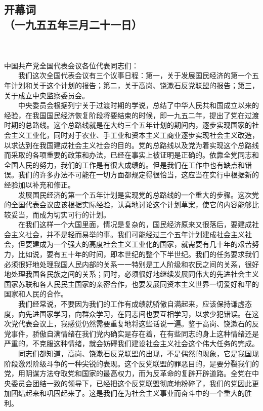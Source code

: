 \documentclass[cn,11pt,chinese]{elegantbook}
\def\myformat#1{\hfil\hfil #1}
\begin{document}
\subsection*{\myformat{开幕词}\\\myformat{（一九五五年三月二十一日）}}
\\~~\\
中国共产党全国代表会议各位代表同志们：\\
　　我们这次全国代表会议有三个议事日程：第一，关于发展国民经济的第一个五年计划和关于这个计划的报告；第二，关于高岗、饶漱石反党联盟的报告；第三，关于成立中央监察委员会。\\
　　中央委员会根据列宁关于过渡时期的学说，总结了中华人民共和国成立以来的经验，在我国国民经济恢复阶段将要结束的时候，即一九五二年，提出了党在过渡时期的总路线。这个总路线就是在大约三个五年计划的期间内，逐步实现国家的社会主义工业化，同时对于农业、手工业和资本主义工商业逐步实现社会主义改造，以求达到在我国建成社会主义社会的目的。党的总路线以及党为着实现这个总路线而采取的各项重要的政策和办法，已经在事实上被证明是正确的。依靠全党同志和全国人民的努力，我们的工作是有很大成绩的。但是我们在工作中也有缺点和错误。我们的许多办法不可能在一切方面都规定得很恰当，这应当在实行中根据新的经验加以补充和修正。\\
　　发展国民经济的第一个五年计划是实现党的总路线的一个重大的步骤。这次党的全国代表会议应该根据实际经验，认真地讨论这个计划草案，使它的内容能够比较妥当，而成为切实可行的计划。\\
　　在我们这样一个大国里面，情况是复杂的，国民经济原来又很落后，要建成社会主义社会，并不是轻而易举的事。我们可能经过三个五年计划建成社会主义社会，但要建成为一个强大的高度社会主义工业化的国家，就需要有几十年的艰苦努力，比如说，要有五十年的时间，即本世纪的整个下半世纪。我们的任务要求我们必须很好地处理我国人民内部的关系一一特别是工人阶级和农民之间的关系，很好地处理我国各民族之间的关系；同时，必须很好地继续发展同伟大的先进社会主义国家苏联和各人民民主国家的亲密合作，也要发展同资本主义世界一切爱好和平的国家和人民的合作。\\
　　我们经常说，不要因为我们的工作有成绩就骄傲自满起来，应该保持谦虚态度，向先进国家学习，向群众学习，在同志间也要互相学习，以求少犯错误。在这次党代表会议上，我感觉仍然需要重复地将这些话说一遍。鉴于高岗、饶漱石的反党事件，骄傲自满情绪在我们党内确实是存在着，在有些同志的身上这种情绪还是严重的，不克服这种情绪，就会妨碍我们建设社会主义社会这个伟大任务的完成。\\
　　同志们都知道，高岗、饶漱石反党联盟的出现，不是偶然的现象，它是我国现阶段激烈阶级斗争的一种尖锐的表现。这个反党联盟的罪恶目的，是要分裂我们的党，用阴谋方法夺取党和国家的最高权力，而为反革命的复辟开辟道路。全党在中央委员会团结一致的领导下，已经把这个反党联盟彻底地粉碎了，我们的党因此更加团结起来和巩固起来了。这是我们在为社会主义事业而奋斗中的一个重大的胜利。\\
\end{document}
